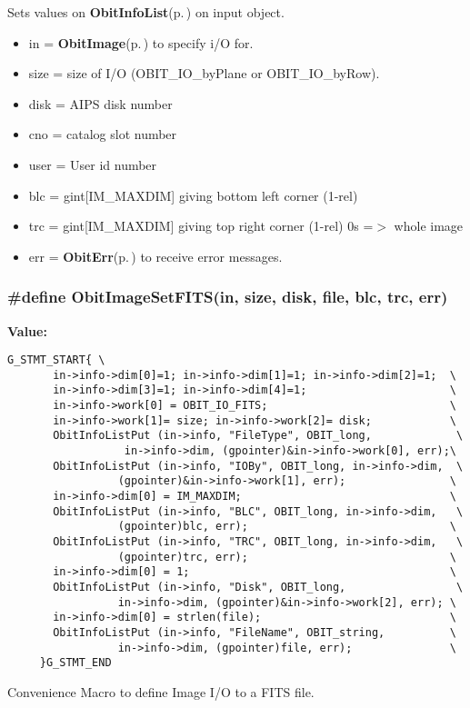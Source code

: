 Sets values on {\bf Obit\-Info\-List}{\rm (p.\,\pageref{structObitInfoList})} on input object. \begin{itemize}
\item in = {\bf Obit\-Image}{\rm (p.\,\pageref{structObitImage})} to specify i/O for. \item size = size of I/O (OBIT\_\-IO\_\-by\-Plane or OBIT\_\-IO\_\-by\-Row). \item disk = AIPS disk number \item cno = catalog slot number \item user = User id number \item blc = gint[IM\_\-MAXDIM] giving bottom left corner (1-rel) \item trc = gint[IM\_\-MAXDIM] giving top right corner (1-rel) 0s =$>$ whole image \item err = {\bf Obit\-Err}{\rm (p.\,\pageref{structObitErr})} to receive error messages. \end{itemize}
\subsubsection{\setlength{\rightskip}{0pt plus 5cm}\#define Obit\-Image\-Set\-FITS(in, size, disk, file, blc, trc, err)}\label{ObitImage_8h_a3}


{\bf Value:}

\footnotesize\begin{verbatim}G_STMT_START{ \
       in->info->dim[0]=1; in->info->dim[1]=1; in->info->dim[2]=1;  \
       in->info->dim[3]=1; in->info->dim[4]=1;                      \
       in->info->work[0] = OBIT_IO_FITS;                            \
       in->info->work[1]= size; in->info->work[2]= disk;            \
       ObitInfoListPut (in->info, "FileType", OBIT_long,             \
                  in->info->dim, (gpointer)&in->info->work[0], err);\
       ObitInfoListPut (in->info, "IOBy", OBIT_long, in->info->dim,  \
                 (gpointer)&in->info->work[1], err);                \
       in->info->dim[0] = IM_MAXDIM;                                \
       ObitInfoListPut (in->info, "BLC", OBIT_long, in->info->dim,   \
                 (gpointer)blc, err);                               \
       ObitInfoListPut (in->info, "TRC", OBIT_long, in->info->dim,   \
                 (gpointer)trc, err);                               \
       in->info->dim[0] = 1;                                        \
       ObitInfoListPut (in->info, "Disk", OBIT_long,                 \
                 in->info->dim, (gpointer)&in->info->work[2], err); \
       in->info->dim[0] = strlen(file);                             \
       ObitInfoListPut (in->info, "FileName", OBIT_string,          \
                 in->info->dim, (gpointer)file, err);               \
     }G_STMT_END
\end{verbatim}\normalsize 
Convenience Macro to define Image I/O to a FITS file. 

